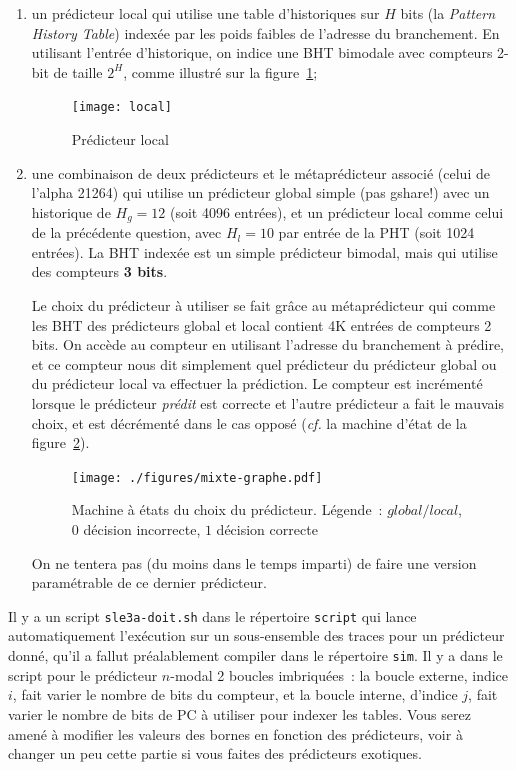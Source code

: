 \documentclass[a4paper]{article}
\begin{document}
\begin{enumerate}
\item un prédicteur local qui utilise une table d'historiques sur $H$ bits (la \textit{Pattern History Table}) indexée par les poids faibles de l'adresse du branchement.  En utilisant l'entrée d'historique, on indice une BHT bimodale avec compteurs 2-bit de taille $2^H$, comme illustré sur la figure~\ref{local};
      \begin{figure}[hbt]\center\leavevmode
      \texttt{[image: local]}
      \caption{Prédicteur local}
      \label{local}
      \end{figure}

\item une combinaison de deux prédicteurs et le métaprédicteur associé (celui de l'alpha 21264) qui utilise un prédicteur global simple (pas gshare!) avec un historique de $H_g=12$ (soit 4096 entrées), et un prédicteur local comme celui de la précédente question, avec $H_l=10$ par entrée de la PHT (soit 1024 entrées).
La BHT indexée est un simple prédicteur bimodal, mais qui utilise des compteurs \textbf{3 bits}.

Le choix du prédicteur à utiliser se fait grâce au métaprédicteur qui comme les BHT des prédicteurs global et local contient 4K entrées de compteurs 2 bits. On accède au compteur en utilisant l'adresse du branchement à prédire, et ce compteur nous dit simplement quel prédicteur du prédicteur global ou du prédicteur local va effectuer la prédiction. Le compteur est incrémenté lorsque le prédicteur \emph{prédit} est correcte et l'autre prédicteur a fait le mauvais choix, et est décrémenté dans le cas opposé (\emph{cf.} la machine d'état de la figure~\ref{mixte-graphe}).
\begin{figure}[hbt]\center\leavevmode
      \texttt{[image: ./figures/mixte-graphe.pdf]}
      \caption{Machine à états du choix du prédicteur.
      Légende~: $global/local$, $0$ décision incorrecte, $1$ décision correcte}
      \label{mixte-graphe}
      \end{figure}

      On ne tentera pas (du moins dans le temps imparti) de faire une version paramétrable de ce dernier prédicteur.
\end{enumerate}

Il y a un script \verb+sle3a-doit.sh+ dans le répertoire \verb+script+ qui lance automatiquement l'exécution sur un sous-ensemble des traces pour un prédicteur donné, qu'il a fallut préalablement compiler dans le répertoire \verb+sim+.
Il y a dans le script pour le prédicteur $n$-modal 2 boucles imbriquées~: la boucle externe, indice $i$, fait varier le nombre de bits du compteur, et la boucle interne, d'indice $j$, fait varier le nombre de bits de PC à utiliser pour indexer les tables.
Vous serez amené à modifier les valeurs des bornes en fonction des prédicteurs, voir à changer un peu cette partie si vous faites des prédicteurs exotiques.
\end{document}
